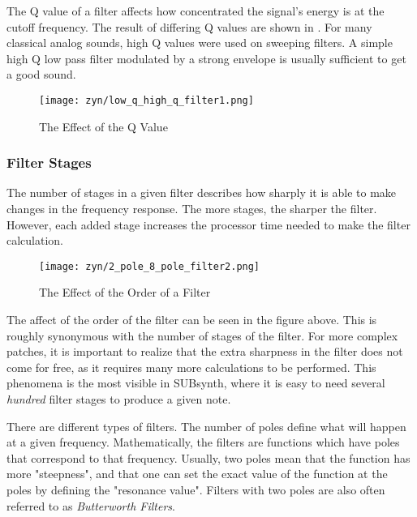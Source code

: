    The Q value of a filter affects how concentrated
   the signal’s energy is at the cutoff frequency. The result of differing Q
   values are shown in .
   For many classical analog sounds, high Q values were used on sweeping
   filters. A simple high Q low pass filter modulated by a strong envelope is
   usually sufficient to get a good sound.

\begin{figure}[H]
   \centering 
   \texttt{[image: zyn/low\_q\_high\_q\_filter1.png]}
   \caption[Low Q vs. High Q]{The Effect of the Q Value}
   \label{fig:low_q_vs_high_q} 
\end{figure}

\subsubsection{Filter Stages}
\label{subsubsec:filter_stages}

   The number of stages in a given filter describes how sharply it is able to
   make changes in the frequency response.
   The more stages, the sharper the filter.
   However, each added stage increases the processor time needed to make the
   filter calculation.

\begin{figure}[H]
   \centering 
   \texttt{[image: zyn/2\_pole\_8\_pole\_filter2.png]}
   \caption[2 Pole vs. 8 Pole Filter]{The Effect of the Order of a Filter}
   \label{fig:2_pole_vs_8_pole_filter}
\end{figure}

   The affect of the order of the filter can be seen in the figure above.
   This is roughly synonymous with the number of stages of the filter. For
   more complex patches, it is important to realize that the extra sharpness
   in the filter does not come for free, as it requires many more
   calculations to be performed. This phenomena is the most visible in
   SUBsynth, where it is easy to need several \textsl{hundred} filter stages
   to produce a given note.

   There are different types of filters. The number of poles define what will
   happen at a given frequency. Mathematically, the filters are functions which
   have poles that correspond to that frequency. Usually, two poles mean that
   the function has more "steepness", and that one can set the exact value of
   the function at the poles by defining the "resonance value". Filters with
   two poles are also often referred to as \textsl{Butterworth Filters}.

